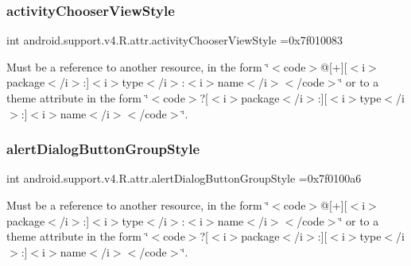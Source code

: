 \subsubsection{\texorpdfstring{activity\+Chooser\+View\+Style}{activityChooserViewStyle}}
{\footnotesize\ttfamily int android.\+support.\+v4.\+R.\+attr.\+activity\+Chooser\+View\+Style =0x7f010083\hspace{0.3cm}{\ttfamily [static]}}

Must be a reference to another resource, in the form \char`\"{}$<$code$>$@\mbox{[}+\mbox{]}\mbox{[}$<$i$>$package$<$/i$>$\+:\mbox{]}$<$i$>$type$<$/i$>$\+:$<$i$>$name$<$/i$>$$<$/code$>$\char`\"{} or to a theme attribute in the form \char`\"{}$<$code$>$?\mbox{[}$<$i$>$package$<$/i$>$\+:\mbox{]}\mbox{[}$<$i$>$type$<$/i$>$\+:\mbox{]}$<$i$>$name$<$/i$>$$<$/code$>$\char`\"{}. \mbox{\label{classandroid_1_1support_1_1v4_1_1R_1_1attr_aff1b8dace5d14ac0be03f8d0e93f1646}} 
\subsubsection{\texorpdfstring{alert\+Dialog\+Button\+Group\+Style}{alertDialogButtonGroupStyle}}
{\footnotesize\ttfamily int android.\+support.\+v4.\+R.\+attr.\+alert\+Dialog\+Button\+Group\+Style =0x7f0100a6\hspace{0.3cm}{\ttfamily [static]}}

Must be a reference to another resource, in the form \char`\"{}$<$code$>$@\mbox{[}+\mbox{]}\mbox{[}$<$i$>$package$<$/i$>$\+:\mbox{]}$<$i$>$type$<$/i$>$\+:$<$i$>$name$<$/i$>$$<$/code$>$\char`\"{} or to a theme attribute in the form \char`\"{}$<$code$>$?\mbox{[}$<$i$>$package$<$/i$>$\+:\mbox{]}\mbox{[}$<$i$>$type$<$/i$>$\+:\mbox{]}$<$i$>$name$<$/i$>$$<$/code$>$\char`\"{}. \mbox{\label{classandroid_1_1support_1_1v4_1_1R_1_1attr_ab442f1d86be2bfb0af44b257ac0b224a}} 
